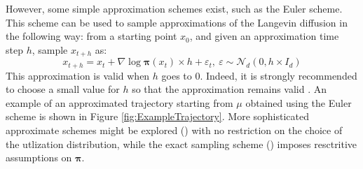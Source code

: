 \documentclass[10pt,a4paper]{article}
\newcommand{\ud}{\boldsymbol{\pi}}
\begin{document}
However, some simple approximation schemes exist, such as the Euler scheme. This scheme can be used to sample approximations of the Langevin diffusion in the following way: from a starting point $x_0$, and given an approximation time step $h$, sample $x_{t+h}$ as:
\begin{equation}
\label{eq:EulerScheme}
x_{t+h} = x_t + \nabla \log \ud(x_t)\times h +\varepsilon_t,~\varepsilon \sim \mathcal{N}_d\left(0, h\times I_d\right)
\end{equation} 
This approximation is valid  when $h$ goes to 0. Indeed, it is strongly recommended to choose a small value for $h$ so that the approximation remains valid \citep{roberts1996exponential}.
An example of an approximated trajectory starting from $\mu$ obtained using the Euler scheme is shown in Figure \ref{fig:ExampleTrajectory}. More sophisticated approximate schemes might be explored (\citealp{gloaguen2017stochastic}) with no restriction on the choice of the utlization distribution, while the exact sampling scheme (\citealp{beskos2006exact}) imposes resctritive assumptions on $\mathbf{\pi}$.
\end{document}
